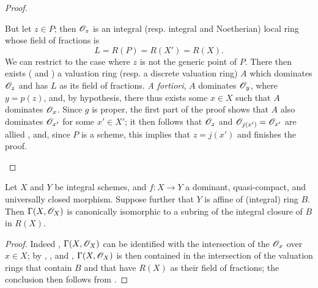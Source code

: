 \begin{proof}
\begin{enumerate}
        But let $z\in P$;
        then $\mathscr{O}_z$ is an integral (resp. integral and Noetherian) local ring whose field of fractions is
        \[
            L = R(P) = R(X') = R(X).
        \]
        We can restrict to the case where $z$ is not the generic point of $P$.
        There then exists ( and ) a valuation ring (resp. a discrete valuation ring) $A$ which dominates $\mathscr{O}_z$ and has $L$ as its field of fractions.
        \emph{A fortiori}, $A$ dominates $\mathscr{O}_y$, where $y=p(z)$, and, by hypothesis, there thus exists some $x\in X$ such that $A$ dominates $\mathscr{O}_x$.
        Since $g$ is proper, the first part of the proof shows that $A$ also dominates $\mathscr{O}_{x'}$ for some $x'\in X'$;
        it then follows that $\mathscr{O}_z$ and $\mathscr{O}_{j(x')}=\mathscr{O}_{x'}$ are allied , and, since $P$ is a scheme, this implies that $z=j(x')$  and finishes the proof.
\end{enumerate}
\end{proof}

\begin{corollary}[7.3.11]
\label{II.7.3.11}
Let $X$ and $Y$ be integral schemes, and $f:X\to Y$ a dominant, quasi-compact, and universally closed morphism.
Suppose further that $Y$ is affine of (integral) ring $B$.
Then $\Gamma(X,\mathscr{O}_X)$ is canonically isomorphic to a subring of the integral closure of $B$ in $R(X)$.
\end{corollary}

\begin{proof}
Indeed , $\Gamma(X,\mathscr{O}_X)$ can be identified with the intersection of the $\mathscr{O}_x$ over $x\in X$;
by , , and , $\Gamma(X,\mathscr{O}_X)$ is then contained in the intersection of the valuation rings that contain $B$ and that have $R(X)$ as their field of fractions;
the conclusion then follows from .
\end{proof}


